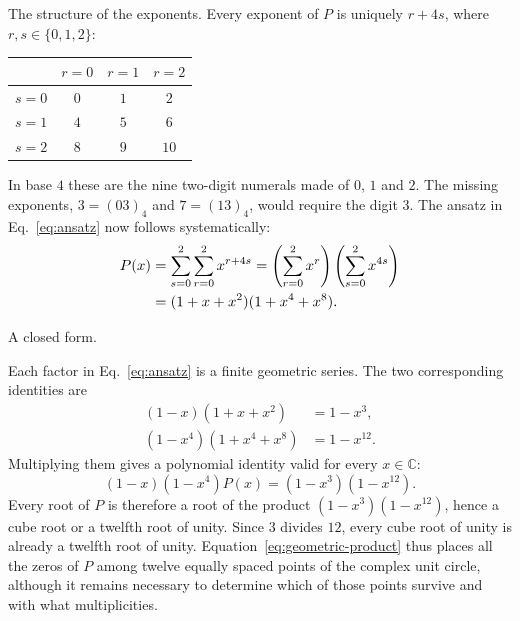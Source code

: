 \documentclass[11pt,aspectratio=169]{beamer}
\newcommand{\slidebody}{%
  \fontsize{10.6}{12.8}\selectfont\justifying%
  \setlength{\parskip}{4.2pt}%
  \setlength{\abovedisplayskip}{4pt}%
  \setlength{\belowdisplayskip}{4pt}%
  \setlength{\abovedisplayshortskip}{2pt}%
  \setlength{\belowdisplayshortskip}{2.5pt}%
}
\newcommand{\tightbody}{\slidebody\fontsize{10.2}{12.3}\selectfont\setlength{\parskip}{3pt}}
\newcommand{\smallequation}{\fontsize{10.5}{13}\selectfont}
\begin{document}
\begin{frame}[t]{The structure of the exponents.}
\tightbody
Every exponent of $P$ is uniquely $r+4s$, where $r,s\in\{0,1,2\}$:
\vspace{-1mm}
\begin{center}
\renewcommand{\arraystretch}{1.18}
\begin{tabular}{c|ccc}
  & $r=0$ & $r=1$ & $r=2$\\\hline
 $s=0$ & $0$ & $1$ & $2$\\
 $s=1$ & $4$ & $5$ & $6$\\
 $s=2$ & $8$ & $9$ & $10$
\end{tabular}
\end{center}
In base $4$ these are the nine two-digit numerals made of $0$, $1$ and $2$. The missing exponents, $3=(03)_4$ and $7=(13)_4$, would require the digit $3$. The ansatz in Eq.~\eqref{eq:ansatz} now follows systematically:
\begin{equation}\label{eq:double-sum}
\smallequation
\begin{aligned}
 P(x)&=\sum_{s=0}^{2}\sum_{r=0}^{2}x^{r+4s}
     =\left(\sum_{r=0}^{2}x^r\right)
      \left(\sum_{s=0}^{2}x^{4s}\right)\\
     &=(1+x+x^2)(1+x^4+x^8).
\end{aligned}
\end{equation}
\end{frame}

\begin{frame}[t]{A closed form.}
\slidebody
Each factor in Eq.~\eqref{eq:ansatz} is a finite geometric series. The two corresponding identities are
\begin{subequations}\label{eq:geometric-series}
\begin{align}
 (1-x)(1+x+x^2)   &=1-x^3,\label{eq:geometric-series-a}\\
 (1-x^4)(1+x^4+x^8)&=1-x^{12}.\label{eq:geometric-series-b}
\end{align}
\end{subequations}
Multiplying them gives a polynomial identity valid for every $x\in\mathbb C$:
\begin{equation}\label{eq:geometric-product}
 (1-x)(1-x^4)P(x)=(1-x^3)(1-x^{12}).
\end{equation}
Every root of $P$ is therefore a root of the product $(1-x^3)(1-x^{12})$, hence a cube root or a twelfth root of unity. Since $3$ divides $12$, every cube root of unity is already a twelfth root of unity. Equation~\eqref{eq:geometric-product} thus places all the zeros of $P$ among twelve equally spaced points of the complex unit circle, although it remains necessary to determine which of those points survive and with what multiplicities.
\end{frame}
\end{document}
